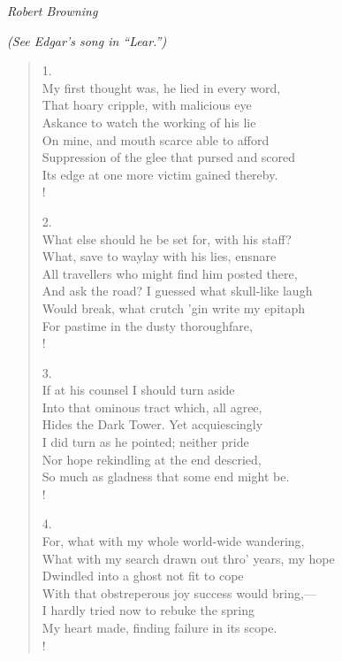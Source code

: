 \documentclass[10pt]{memoir}
\newcommand{\poemauthor}[1]{{\small\itshape #1}\par\medskip}
\begin{document}
\begin{verse}
\end{verse}

\clearpage

\poemauthor{Robert Browning}
{\small\itshape (See Edgar's song in ``Lear.'')\par}\medskip

\begin{verse}
1.\\
My first thought was, he lied in every word,\\
\vin That hoary cripple, with malicious eye\\
\vin Askance to watch the working of his lie\\
On mine, and mouth scarce able to afford\\
Suppression of the glee that pursed and scored\\
\vin Its edge at one more victim gained thereby.\\!

2.\\
What else should he be set for, with his staff?\\
\vin What, save to waylay with his lies, ensnare\\
\vin All travellers who might find him posted there,\\
And ask the road? I guessed what skull-like laugh\\
Would break, what crutch 'gin write my epitaph\\
\vin For pastime in the dusty thoroughfare,\\!

3.\\
If at his counsel I should turn aside\\
\vin Into that ominous tract which, all agree,\\
\vin Hides the Dark Tower. Yet acquiescingly\\
I did turn as he pointed; neither pride\\
Nor hope rekindling at the end descried,\\
\vin So much as gladness that some end might be.\\!

4.\\
For, what with my whole world-wide wandering,\\
\vin What with my search drawn out thro' years, my hope\\
\vin Dwindled into a ghost not fit to cope\\
With that obstreperous joy success would bring,---\\
I hardly tried now to rebuke the spring\\
\vin My heart made, finding failure in its scope.\\!


\end{verse}
\end{document}
